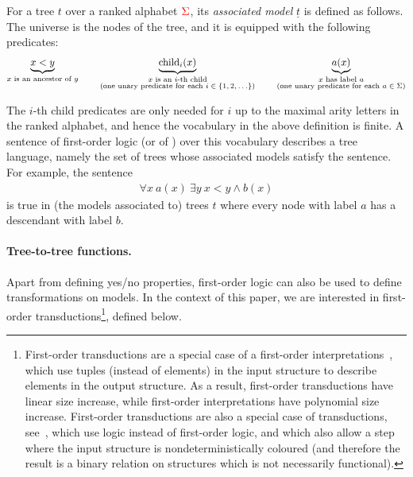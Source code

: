 \begin{definition}\label{def:tree-model}
   For a tree $t$  over a ranked alphabet ${\color{red}{\Sigma}}$, its \emph{associated model} $\underline t$ is defined as follows. The  universe is the nodes of the tree, and it is equipped with the following predicates:
    \begin{align*}
        \underbrace{x < y}_{\substack{\text{$x$ is an ancestor of $y$}}} \qquad \underbrace{\mathrm{child}_i(x)}_{\substack{\text{$x$ is an $i$-th child}\\ \text{(one unary predicate for each $i\in \{1,2,\ldots\}$)}}}
        \qquad \underbrace{a(x)}_{\substack{\text{$x$ has label $a$}\\ \text{(one unary predicate for each $a \in \Sigma$)}}}
    \end{align*}
    \end{definition}

The $i$-th child predicates are only needed for $i$ up to the maximal arity letters in the ranked alphabet, and hence the vocabulary in the above definition is finite. 
 A sentence of first-order logic (or of \mso)  over this vocabulary   describes a tree language, namely the set of trees whose associated models satisfy the sentence.  For example, the sentence 
 \begin{align*}
 \forall x \ a(x) \ \exists y \ x < y \land b(x)
 \end{align*} 
 is true in (the models associated to)  trees $t$ where every node with label $a$ has a descendant with label $b$.  
 
 \paragraph*{Tree-to-tree functions.}
 Apart from defining yes/no properties, first-order logic can also be used  to define transformations on  models. In the context of this paper, we are interested in first-order transductions\footnote{
    First-order transductions are  a special case of a first-order interpretations~\cite[p.~213]{hodges_model_1993}, which use tuples (instead of elements) in the input structure to describe elements in the output structure. As a result, first-order transductions have linear size increase, while first-order interpretations have polynomial size increase. First-order transductions are also a special case of \mso transductions, see~\cite[Section 7]{courcelle_graph_2012}, which use \mso logic instead of first-order logic, and which also allow a step where the input structure is nondeterministically coloured (and therefore the result is a binary relation on structures which is not necessarily functional).
 }, defined below. 

